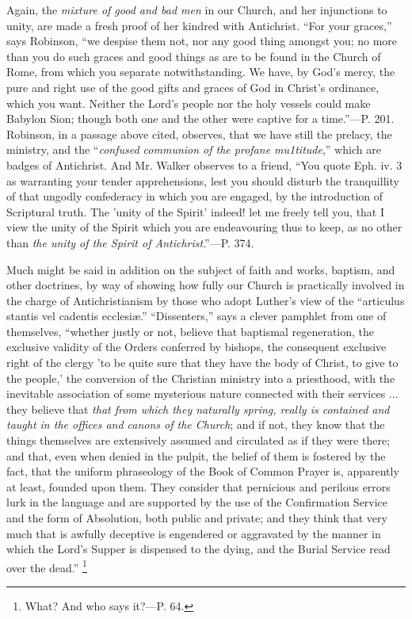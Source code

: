 Again, the \emph{mixture of good and bad men} in our Church, and
her injunctions to unity, are made a fresh proof of her kindred with
Antichrist. ``For your graces,'' says Robinson, ``we
despise them not, nor any good thing amongst you; no more than you do
such graces and good things as are to be found in the Church of Rome,
from which you separate notwithstanding. We have, by God's mercy, the
pure and right use of the good gifts and graces of God in Christ's
ordinance, which you want. Neither the Lord's people nor the holy
vessels could make Babylon Sion; though both one and the other were
captive for a time.''—P. 201. Robinson, in a passage above
cited, observes, that we have still the prelacy, the ministry, and the
``\emph{confused communion of the profane mu1titude},'' which
are badges of Antichrist. And Mr. Walker observes to a friend,
``You quote Eph. iv. 3 as warranting your tender apprehensions,
lest you should disturb the tranquillity of that ungodly confederacy
in which you are engaged, by the introduction of Scriptural truth. The
'unity of the Spirit' indeed! let me freely tell you, that I view the
unity of the Spirit which you are endeavouring thus to keep, as no
other than \emph{the unity of the Spirit of Antichrist}.''—P.
374.

Much might be said in addition on the subject of faith and
works, baptism, and other doctrines, by way of showing how fully our
Church is practically involved in the charge of Antichristianism by
those who adopt Luther's view of the ``articulus stantis vel
cadentis ecclesiæ.'' ``Dissenters,'' says a clever
pamphlet from one of themselves, ``whether justly or not, believe
that baptismal regeneration, the exclusive validity of the Orders
conferred by bishops, the consequent exclusive right of the clergy 'to
be quite sure that they have the body of Christ, to give to the
people,' the conversion of the Christian ministry into a priesthood,
with the inevitable association of some mysterious nature connected
with their services ... they believe that \emph{that from which they
naturally spring, really is contained and taught in the offices and
canons of the Church}; and if not, they know that the things
themselves are extensively assumed and circulated as if they were
there; and that, even when denied in the pulpit, the belief of them is
fostered by the fact, that the uniform phraseology of the Book of
Common Prayer is, apparently at least, founded upon them. They
consider that pernicious and perilous errors lurk in the language and
are supported by the use of the Confirmation Service and the form of
Absolution, both public and private; and they think that very much
that is awfully deceptive is engendered or aggravated by the manner in
which the Lord's Supper is dispensed to the dying, and the Burial
Service read over the dead.'' \footnote{What? And who says it?—P. 64.}

